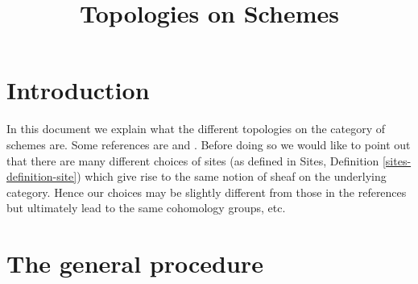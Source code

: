 

%


\title{Topologies on Schemes}

\maketitle

\label{section-phantom}

\tableofcontents



\section{Introduction}
\label{section-introduction}

\noindent
In this document we explain what the different topologies on the
category of schemes are. Some references are \cite{SGA1} and \cite{Ner}.
Before doing so we would like to point out that there are many
different choices of sites (as defined in
Sites, Definition \ref{sites-definition-site}) which give rise to
the same notion of sheaf on the underlying category. Hence
our choices may be slightly different from those in the references
but ultimately lead to the same cohomology groups, etc.

\section{The general procedure}
\label{section-procedure}

